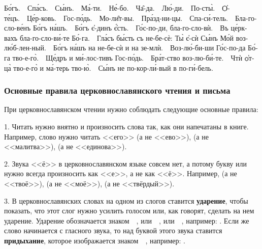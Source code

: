 \documentclass[11pt,a4paper,oneside]{memoir}
\begin{document}
    \begin{center}
        \begin{slv}
            Бо́гъ.~\textemdash~Спа́съ.~\textemdash~Сы́нъ.~\textemdash~Ма́-ти.~\textemdash~Не́-бо.~\textemdash~Ча̑-да.~\textemdash~Лю́-ди.~\textemdash~По-сты̀.~\textemdash~Ѻ҆-те́цъ.~\textemdash~Це́р-ковь.~\textemdash~Гос-по́дь.~\textemdash~Мо-ли̑т-вы.~\textemdash~Пра́зд-ни-цы.~\textemdash~Спа-си́-тель.~\textemdash~Бла-го-сло-ве́нъ Бо́гъ на́шъ.~\textemdash~Бо́гъ є҆-динъ є҆́сть.~\textemdash~Го́с-по-ди, бла-го-сло-вѝ.~\textemdash~Въ це́рк-вахъ бла-го-сло-ви́-те Бо́-га.~\textemdash~Гла́съ бы́сть съ не-бе-сѐ: Ты̀ є҆-сѝ Сы́нъ Мо́й воз-лю́б-лен-ный.~\textemdash~Бо́гъ на́шъ на не-бе-сѝ и на зе-млѝ.~\textemdash~Воз-лю́-би-ши Го́с-по-да Бо́-га тво-е-го̀.~\textemdash~Ще́дръ и ми́-лос-тивъ Гос-по́дь.~\textemdash~Бра́т-ство воз-лю-би́-те.~\textemdash~Чтѝ ѻ҆т-ца̀ тво-е-го̀ и ма́-терь тво-ю̀.~\textemdash~Сы́нъ не по-кор-ли́-вый в по-ги́-бель.
        \end{slv}
    \end{center}


                \subsubsection{Основные правила церковнославянского чтения и письма}
                
    При церковнославянском чтении нужно соблюдать следующие основные правила:
    
    1. Читать нужно внятно и произносить слова так, как они напечатаны в книге. Например, слово {} нужно читать <<его>> (а не <<ево>>), {} (а не <<малитва>>), {} (а не <<единова>>).
    
    2. Звука <<ё>> в церковнославянском языке совсем нет, а потому букву {} или {} нужно всегда произносить как <<е>>, а не как <<ё>>. Например, {} (а не <<твоё>>), {} (а не <<моё>>), {} (а не <<твёрдый>>).
    
    3. В церковнославянских словах на одном из слогов ставится \textbf{ударение}, чтобы показать, что этот слог нужно усилить голосом или, как говорят, сделать на нем ударение. Ударение обозначается знаком~~{}, или~~{}, или~~{}, например: {}. Если же слово начинается с гласного звука, то над буквой этого звука ставится \textbf{придыхание}, которое изображается знаком~~{}, например: {}.
    
\end{document}
